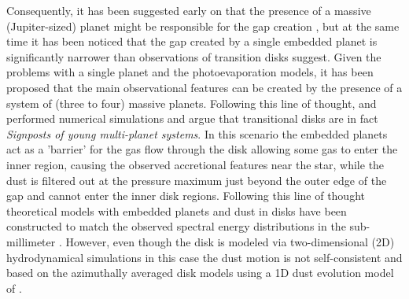 \documentclass[10pt,fleqn,twoside]{article}
\begin{document}
Consequently, it has been suggested early on that the presence of a massive (Jupiter-sized) planet might be responsible for the
gap creation \citep{2006ApJ...640.1110V,2006MNRAS.373.1619R},
but at the same time it has been noticed that the gap created
by a single embedded planet is significantly narrower than
observations of transition disks suggest.
Given the problems with a single planet and the photoevaporation models, it has been proposed that the main observational
features can be created by the presence of a system of (three to four) massive planets.
Following this line of thought, \citet{2011ApJ...729...47Z}
and \citet{2011ApJ...738..131D}
performed numerical simulations and argue that transitional disks are in fact {\itshape Signposts of young multi-planet systems}.
In this scenario the embedded planets act as a 'barrier' for the gas flow through the disk allowing some
gas to enter the inner region, causing the observed accretional features near the star, while the dust
is filtered out at the pressure maximum just beyond the outer edge of the gap and cannot enter the inner disk regions.
Following this line of thought theoretical models with embedded planets and dust in disks
have been constructed to match the observed spectral energy distributions in the sub-millimeter
\citep{2013A&A...560A.111D,2015A&A...573A...9P}. However, even though the disk is modeled via
two-dimensional (2D) hydrodynamical simulations in this case the dust motion is not 
self-consistent and based on the azimuthally averaged
disk models using a 1D dust evolution model of \citet{2010A&A...513A..79B}.
\end{document}
